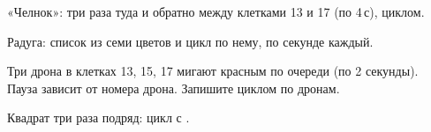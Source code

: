 \begin{probuy}
  \item «Челнок»: три раза туда и обратно между клетками 13 и 17 (по 4\,с), циклом.
  \item Радуга: список из семи цветов  и цикл по нему, по секунде каждый.
  \item Три дрона в клетках 13, 15, 17 мигают красным по очереди (по 2 секунды). Пауза зависит от номера дрона. Запишите циклом по дронам.
  \item Квадрат три раза подряд: цикл  с .
\end{probuy}
